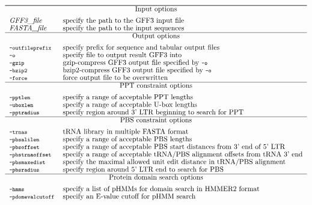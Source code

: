 \documentclass[12pt,titlepage]{article}
\newcommand{\LTRdigest}{\textit{LTRdigest}\xspace}
\begin{document}
\begin{table}[htbp]
\caption{Overview of the \LTRdigest options sorted by categories.}
\begin{footnotesize}
\[
\renewcommand{\arraystretch}{0.89}
\begin{tabular}{ll}\hline
\Showoptiongroup{Input options}
\emph{GFF3\_file}& specify the path to the GFF3 input file
\\
\emph{FASTA\_file}& specify the path to the input sequences
\\

\Showoptiongroup{Output options}
\Showoption{outfileprefix}& specify prefix for sequence and tabular output files
\\
\Showoption{o}& specify file to output result GFF3 into
\\
\Showoption{gzip}& gzip-compress GFF3 output file specified by \Showoption{o}
\\
\Showoption{bzip2}& bzip2-compress GFF3 output file specified by \Showoption{o}
\\
\Showoption{force}& force output file to be overwritten
\\
\Showoptiongroup{PPT constraint options}
\Showoption{pptlen}& specify a range of acceptable PPT lengths
\\
\Showoption{uboxlen}& specify a range of acceptable U-box lengths
\\
\Showoption{pptradius}& specify region around 3' LTR beginning to search for PPT
\\
\Showoptiongroup{PBS constraint options}
\Showoption{trnas}& tRNA library in multiple FASTA format
\\
\Showoption{pbsalilen}& specify a range of acceptable PBS lengths
\\
\Showoption{pbsoffset}& specify a range of acceptable PBS start distances from 3' end of 5' LTR
\\
\Showoption{pbstrnaoffset}& specify a range of acceptable tRNA/PBS alignment offsets from tRNA 3' end
\\
\Showoption{pbsmaxedist}& specify the maximal allowed unit edit distance in tRNA/PBS alignment
\\
\Showoption{pbsradius}& specify region around 5' LTR end to search for PBS
\\
\Showoptiongroup{Protein domain search options}
\Showoption{hmms}& specify a list of pHMMs for domain search in HMMER2 format
\\
\Showoption{pdomevalcutoff}& specify an E-value cutoff for pHMM search
\\

\end{tabular}\]
\end{footnotesize}
\end{table}
\end{document}
